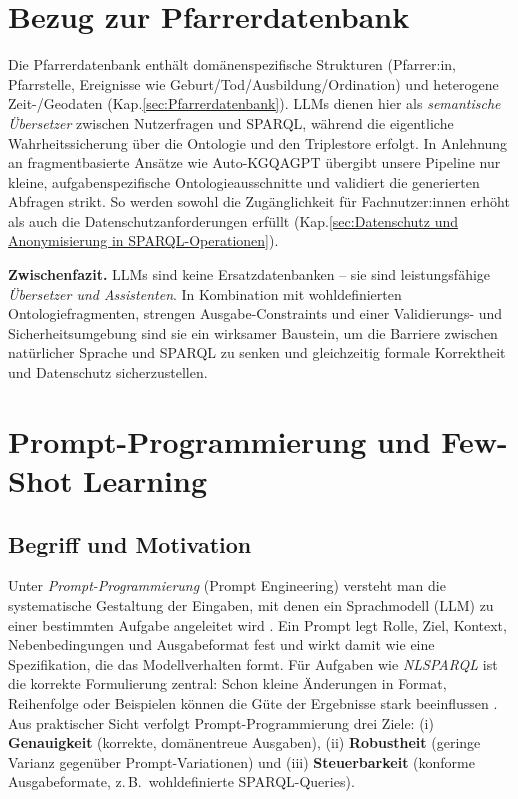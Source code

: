 \section{Bezug zur Pfarrerdatenbank}
\label{sec:LLM-Bezug-Pfarrerdatenbank}

Die Pfarrerdatenbank enthält domänenspezifische Strukturen (Pfarrer:in, Pfarrstelle, Ereignisse wie Geburt/Tod/Ausbildung/Ordination) und heterogene Zeit-/Geodaten (Kap.\ref{sec:Pfarrerdatenbank}). LLMs dienen hier als \emph{semantische Übersetzer} zwischen Nutzerfragen und SPARQL, während die eigentliche Wahrheitssicherung über die Ontologie und den Triplestore erfolgt. In Anlehnung an fragmentbasierte Ansätze wie Auto-KGQAGPT \cite{avila2024text2sparql} übergibt unsere Pipeline nur kleine, aufgabenspezifische Ontologieausschnitte und validiert die generierten Abfragen strikt. So werden sowohl die Zugänglichkeit für Fachnutzer:innen erhöht als auch die Datenschutzanforderungen erfüllt (Kap.\ref{sec:Datenschutz und Anonymisierung in SPARQL-Operationen}).

\bigskip
\noindent\textbf{Zwischenfazit.} LLMs sind keine Ersatzdatenbanken – sie sind leistungsfähige \emph{Übersetzer und Assistenten}. In Kombination mit wohldefinierten Ontologiefragmenten, strengen Ausgabe-Constraints und einer Validierungs- und Sicherheitsumgebung sind sie ein wirksamer Baustein, um die Barriere zwischen natürlicher Sprache und SPARQL zu senken und gleichzeitig formale Korrektheit und Datenschutz sicherzustellen.




\section{Prompt-Programmierung und Few-Shot Learning}
\label{sec:Prompt-Programmierung/Few-shot Learning}

\subsection{Begriff und Motivation}
Unter \emph{Prompt-Programmierung} (Prompt Engineering) versteht man die systematische Gestaltung der Eingaben, mit denen ein Sprachmodell (LLM) zu einer bestimmten Aufgabe angeleitet wird \cite{tabatabaianPromptBook,campesatoLLMIntro}. Ein Prompt legt Rolle, Ziel, Kontext, Nebenbedingungen und Ausgabeformat fest und wirkt damit wie eine Spezifikation, die das Modellverhalten formt. Für Aufgaben wie \emph{NL{\textrightarrow}SPARQL} ist die korrekte Formulierung zentral: Schon kleine Änderungen in Format, Reihenfolge oder Beispielen können die Güte der Ergebnisse stark beeinflussen \cite{brown2020language,zhao2021calibrate}. Aus praktischer Sicht verfolgt Prompt-Programmierung drei Ziele: (i) \textbf{Genauigkeit} (korrekte, domänentreue Ausgaben), (ii) \textbf{Robustheit} (geringe Varianz gegenüber Prompt-Variationen) und (iii) \textbf{Steuerbarkeit} (konforme Ausgabeformate, z.\,B.\ wohldefinierte SPARQL-Queries).

